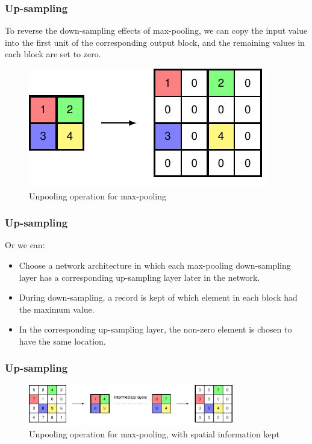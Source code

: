 \documentclass{beamer}
\begin{document}
\begin{frame}
    \frametitle{Up-sampling}
    To reverse the down-sampling effects of max-pooling, we can copy the input value into the first unit of the corresponding output block, and the remaining values in each block are set to zero.
    \begin{figure}
        \caption{Unpooling operation for max-pooling}
        \includegraphics{Figure_28_b.pdf}
    \end{figure}
\end{frame}

\begin{frame}
    \frametitle{Up-sampling}
    Or we can:
    \begin{itemize}
        \item Choose a network architecture in which each max-pooling down-sampling layer has a corresponding up-sampling layer later in the network.
        \item During down-sampling, a record is kept of which element in each block had the maximum value.
        \item In the corresponding up-sampling layer, the non-zero element is chosen to have the same location.
    \end{itemize}
\end{frame}

\begin{frame}
    \frametitle{Up-sampling}
    \begin{figure}
        \caption{Unpooling operation for max-pooling, with spatial information kept}
        \includegraphics[width=0.8\textwidth]{Figure_29.pdf}
    \end{figure}
\end{frame}
\end{document}
